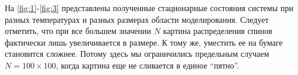 \documentclass[12pt,a4paper]{article}
\begin{document}
        На \autoref{fig:1}-\autoref{fig:3} представлены полученные стационарные состояния системы при разных температурах и разных размерах области моделирования. Следует отметить, что при все большем значении $N$ картина распределения спинов фактически лишь увеличивается в размере. К тому же, уместить ее на бумаге становится сложнее. Потому здесь мы ограничились предельным случаем $N = 100 \times 100$, когда картина еще не сливается в единое \enquote{пятно}.
        \begin{figure}[!htb]%
            \centering
            \hspace{8pt}%
            \hspace{8pt}%
            \hspace{8pt}%
            \hspace{8pt}%

\end{figure}
\end{document}
